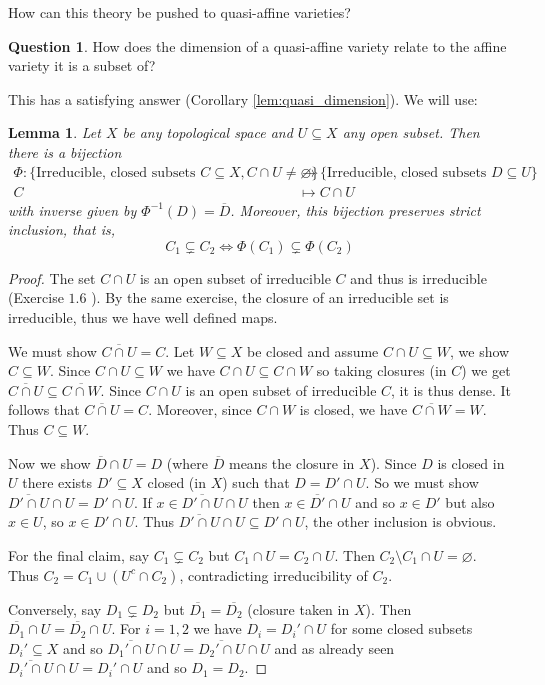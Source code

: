 \documentclass[12pt]{article}
\theoremstyle{plain}
\newtheorem{lemma}[thm]{Lemma}
\theoremstyle{definition}
\newtheorem{question}[thm]{Question}
\newcommand{\lto}{\longrightarrow}
\begin{document}
How can this theory be pushed to quasi-affine varieties?
\begin{question}\label{question:quasi}
How does the dimension of a quasi-affine variety relate to the affine variety it is a subset of?
\end{question}
This has a satisfying answer (Corollary \ref{lem:quasi_dimension}). We will use:
\begin{lemma}\label{lem:the_lemma_never_stated}
Let $X$ be any topological space and $U \subseteq X$ any open subset. Then there is a bijection
\begin{align}
    \Phi: \lbrace \text{Irreducible, closed subsets }C \subseteq X, C \cap U \neq \varnothing \rbrace &\lto \lbrace \text{Irreducible, closed subsets }D \subseteq U\rbrace\\
    C &\longmapsto C \cap U
\end{align}
with inverse given by $\Phi^{-1}(D) = \overline{D}$. Moreover, this bijection preserves strict inclusion, that is,
\begin{equation}
    C_1 \subsetneq C_2 \Longleftrightarrow \Phi(C_1) \subsetneq \Phi(C_2)
\end{equation}
\end{lemma}
\begin{proof}
The set $C \cap U$ is an open subset of irreducible $C$ and thus is irreducible (Exercise $1.6$ \cite{hartshorne_solutions}). By the same exercise, the closure of an irreducible set is irreducible, thus we have well defined maps.

We must show $\overline{C \cap U} = C$. Let $W \subseteq X$ be closed and assume $C \cap U \subseteq W$, we show $C \subseteq W$. Since $C \cap U \subseteq W$ we have $C \cap U \subseteq C \cap W$ so taking closures (in $C$) we get $\overline{C \cap U} \subseteq \overline{C \cap W}$. Since $C \cap U$ is an open subset of irreducible $C$, it is thus dense. It follows that $\overline{C \cap U} = C$. Moreover, since $C \cap W$ is closed, we have $\overline{C \cap W} = W$. Thus $C \subseteq W$.

Now we show $\overline{D} \cap U = D$ (where $\overline{D}$ means the closure in $X$). Since $D$ is closed in $U$ there exists $D' \subseteq X$ closed (in $X$) such that $D = D' \cap U$. So we must show $\overline{D' \cap U} \cap U = D' \cap U$. If $x \in \overline{D' \cap U} \cap U$ then $x \in \overline{D'} \cap U$ and so $x \in D'$ but also $x \in U$, so $x \in D' \cap U$. Thus $\overline{D' \cap U} \cap U \subseteq D' \cap U$, the other inclusion is obvious.

For the final claim, say $C_1 \subsetneq C_2$ but $C_1 \cap U = C_2 \cap U$. Then $C_2\setminus C_1 \cap U = \varnothing$. Thus $C_2 = C_1 \cup (U^c \cap C_2)$, contradicting irreducibility of $C_2$.

Conversely, say $D_1 \subsetneq D_2$ but $\overline{D_1} = \overline{D_2}$ (closure taken in $X$). Then $\overline{D_1} \cap U = \overline{D_2} \cap U$. For $i=1,2$ we have $D_i = D_i' \cap U$ for some closed subsets $D_i' \subseteq X$ and so $\overline{D_1' \cap U} \cap U = \overline{D_2' \cap U} \cap U$ and as already seen $\overline{D_i' \cap U} \cap U = D_i' \cap U$ and so $D_1 = D_2$.
\end{proof}
\end{document}
